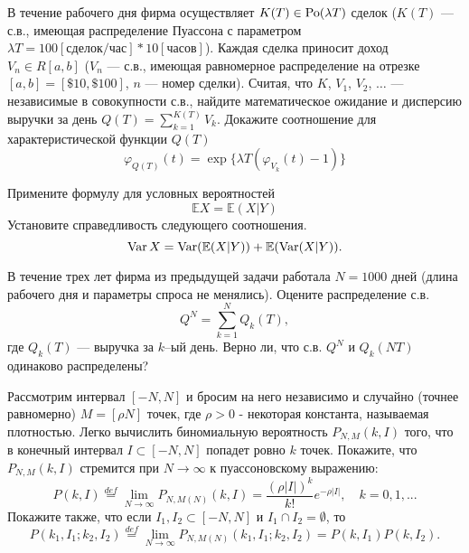 \begin{problem}
В течение рабочего дня фирма осуществляет $K(T)\in \mathrm{Po}(\lambda T)$ сделок ($K(T)$ --- с.в., имеющая распределение Пуассона с параметром 
$\lambda T = 100 [\text{сделок/час}] * 10 [\text{часов}]$). Каждая сделка приносит доход $V_n\in R[a,b]$ ($V_n$ --- с.в., имеющая 
равномерное распределение на отрезке $[a,b]=[\$ 10, \$ 100]$, $n$ --- номер сделки). Считая, что $K$, $V_1$, $V_2$, $\ldots$ --- 
независимые в совокупности с.в., найдите математическое ожидание и дисперсию выручки за день $Q(T)=\sum\limits_{k=1}^{K(T)} V_k$. Докажите соотношение для характеристической функции $Q(T)$
$$
\varphi_{Q(T)}(t)=\exp\{ \lambda T(\varphi_{V_k}(t)-1)\} 
$$
   
\end{problem}

\begin{ordre}

Примените формулу для условных вероятностей  
$$
{\mathbb E}X={\mathbb E}(X|Y) 
$$
Установите справедливость следующего соотношения.
$$
\mathop{\mathrm{Var}}\nolimits X=\mathop{\mathrm{Var}}\nolimits({\mathbb E}(X|Y))+{\mathbb E}(\mathop{\mathrm{Var}}\nolimits(X|Y)) . 
$$

\end{ordre}


\begin{problem}
В течение трех лет фирма из предыдущей задачи работала $N=1000$ дней (длина рабочего дня и параметры спроса не менялись). 
Оцените распределение с.в. 
$$Q^N=\sum\limits_{k=1}^{N} Q_k(T), 
$$
где $Q_k(T)$ --- выручка за $k$–ый день. Верно ли, что с.в. $Q^N$ и $Q_k(NT)$ одинаково распределены? 
\end{problem}




\begin{problem}
Рассмотрим интервал 
$\left[ {-N,N} \right]$ и бросим на него независимо и случайно (точнее 
равномерно) $M=\left[ {\rho N} \right]$ точек, где $\rho >0$ - некоторая 
константа, называемая плотностью. Легко вычислить биномиальную вероятность 
$P_{N,M} \left( {k,I} \right)$ того, что в конечный интервал $I\subset 
\left[ {-N,N} \right]$ попадет ровно $k$ точек. Покажите, что $P_{N,M} 
\left( {k,I} \right)$ стремится при $N\to \infty $ к пуассоновскому 
выражению:
\[
P\left( {k,I} \right)\mathop =\limits^{def} \mathop {\lim }\limits_{N\to 
\infty } P_{N,M\left( N \right)} \left( {k,I} \right)=\frac{\left( {\rho 
\left| I \right|} \right)^k}{k!}e^{-\rho \left| I \right|},
\quad
k=0,1,...
\]
Покажите также, что если $I_1 ,I_2 \subset \left[ {-N,N} \right]$ и $I_1 
\cap I_2 =\emptyset $, то
\[
P\left( {k_1 ,I_1 ;k_2 ,I_2 } \right)\mathop =\limits^{def} \mathop {\lim 
}\limits_{N\to \infty } P_{N,M\left( N \right)} \left( {k_1 ,I_1 ;k_2 ,I_2 } 
\right)=P\left( {k,I_1 } \right)P\left( {k,I_2 } \right).
\]
\end{problem}




